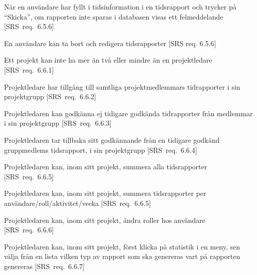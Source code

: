 \documentclass[a4paper]{article}
\begin{document}
\begin{appendices}
\begin{FT}
\item
När en användare har fyllt i tidsinformation i en tidsrapport och trycker på ``Skicka'', om rapporten inte sparas i databasen visas ett felmeddelande [SRS~req.~6.5.6]

\item
En användare kan ta bort och redigera tidsrapporter [SRS req. 6.5.6]


\item
Ett projekt kan inte ha mer än två eller mindre än en projektledare [SRS~req.~6.6.1]

\item
Projektledare har tillgång till samtliga projektmedlemmars tidrapporter i sin projektgrupp [SRS~req.~6.6.2]

\item
Projektledaren kan godkänna ej tidigare godkända tidrapporter från medlemmar i sin projektgrupp [SRS~req.~6.6.3]

\item
Projektledaren tar tillbaka sitt godkännande från en tidigare godkänd gruppmedlems tidsrapport, i sin projektgrupp [SRS~req.~6.6.4]

\item
Projektledaren kan, inom sitt projekt, summera alla tidsrapporter [SRS~req.~6.6.5]

\item
Projektledaren kan, inom sitt projekt, summera tidsrapporter per användare/roll/aktivitet/vecka [SRS~req.~6.6.5]

\item
Projektledaren kan, inom sitt projekt, ändra roller hos användare [SRS~req.~6.6.6]

\item
Projektledaren kan, inom sitt projekt, först klicka på statistik i en meny, sen välja från en lista vilken typ av rapport som ska genereras vart på rapporten genereras [SRS~req.~6.6.7]

\end{FT}
\end{appendices}



\newpage
\end{document}
